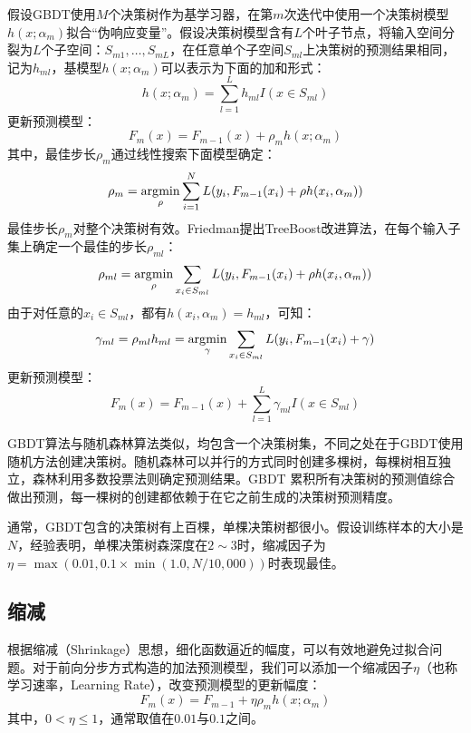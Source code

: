 假设GBDT使用$M$个决策树作为基学习器，在第$m$次迭代中使用一个决策树模型$h(x;\alpha_m)$拟合“伪响应变量”。假设决策树模型含有$L$个叶子节点，将输入空间分裂为$L$个子空间：$S_{m1},\ldots,S_{mL}$，在任意单个子空间$S_{ml}$上决策树的预测结果相同，记为$h_{ml}$，基模型$h(x;\alpha_m)$可以表示为下面的加和形式：
\begin{equation}
    h(x;\alpha_m) = \sum\limits_{l=1}^L h_{ml} I(x\in S_{ml})
\end{equation}
更新预测模型：
\begin{equation}
    F_m(x) = F_{m-1}(x) + \rho_m h(x;\alpha_m)
\end{equation}
其中，最佳步长$\rho_m$通过线性搜索下面模型确定：
\begin{equation}
    \rho_m = \operatorname*{\mathrm{\arg\!\min}}_{\rho} \sum\limits_{i=1}^N L(y_i, F_{m-1}(x_i) + \rho h(x_i,\alpha_m))
\end{equation}
最佳步长$\rho_m$对整个决策树有效。Friedman提出TreeBoost改进算法，在每个输入子集上确定一个最佳的步长$\rho_{ml}$：
\begin{equation}
    \rho_{ml} = \operatorname*{\mathrm{\arg\!\min}}_{\rho} \sum\limits_{x_i\in S_{ml}} L(y_i, F_{m-1}(x_i) + \rho h(x_i,\alpha_m))
\end{equation}
由于对任意的$x_i\in S_{ml}$，都有$h(x_i,\alpha_m)=h_{ml}$，可知：
\begin{equation}
    \gamma_{ml} = \rho_{ml} h_{ml} = \operatorname*{\mathrm{\arg\!\min}}_{\gamma} \sum\limits_{x_i\in S_{ml}} L(y_i, F_{m-1}(x_i) + \gamma)
\end{equation}
更新预测模型：
\begin{equation}
    F_m(x) = F_{m-1}(x) + \sum\limits_{l=1}^L \gamma_{ml} I(x\in S_{ml})
\end{equation}

GBDT算法与随机森林算法类似，均包含一个决策树集，不同之处在于GBDT使用随机方法创建决策树。随机森林可以并行的方式同时创建多棵树，每棵树相互独立，森林利用多数投票法则确定预测结果。GBDT 累积所有决策树的预测值综合做出预测，每一棵树的创建都依赖于在它之前生成的决策树预测精度。

通常，GBDT包含的决策树有上百棵，单棵决策树都很小。假设训练样本的大小是$N$，经验表明，单棵决策树森深度在$2\sim 3$时，缩减因子为$\eta=\max(0.01,0.1\times \min(1.0,N/10,000))$时表现最佳。

\subsection{缩减}
根据缩减（Shrinkage）思想，细化函数逼近的幅度，可以有效地避免过拟合问题。对于前向分步方式构造的加法预测模型，我们可以添加一个缩减因子$\eta$（也称学习速率，Learning Rate），改变预测模型的更新幅度：
\begin{equation}
    F_m(x) = F_{m-1} + \eta \rho_m h(x;\alpha_m)
\end{equation}
其中，$0<\eta \le 1$，通常取值在$0.01$与$0.1$之间。


